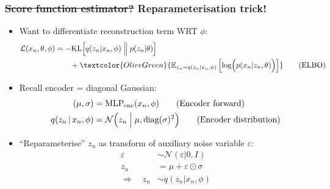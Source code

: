 \documentclass[xcolor=table,dvipsnames]{beamer}
\begin{document}
\begin{frame}[t]
    \frametitle{\sout{Score function estimator?} Reparameterisation trick!}
    \begin{itemize}
        \item Want to differentiate \textcolor{OliveGreen}{reconstruction} term WRT $\phi$:
        \begin{align*}
            \mathcal{L}(x_n, \theta, \phi) &= -\text{KL}\Bigl[q(z_n \vert x_n, \phi) \Bigm\Vert p(z_n \vert \theta)\Bigr] \\
            &\qquad + \textcolor{OliveGreen}{\mathbb{E}_{z_n\sim q(z_n \vert x_n, \phi)}\left[ \log \Bigl(p(x_n \vert z_n, \theta)\Bigr) \right]} \tag{ELBO}
        \end{align*}
        \item Recall encoder = diagonal Gaussian:
        \begin{align*}
            (\mu, \sigma) &= \text{MLP}_\text{enc}(x_n, \phi) \tag{Encoder forward} \\
            q(z_n \,\vert\, x_n, \phi) &= \mathcal{N}\Bigl( z_n \Bigm\vert \mu, \text{diag}(\sigma)^2 \Bigr) \tag{Encoder distribution}
        \end{align*}
        \item ``Reparameterise'' $z_n$ as transform of auxiliary noise variable $\varepsilon$:
        \begin{align*}
            \varepsilon &\sim \mathcal{N}(\varepsilon \vert 0, I) \tag{Auxiliary noise sample} \\
            z_n &= \mu + \varepsilon \odot \sigma \tag{Reparameterisation trick} \\
            \Rightarrow\quad z_n &\sim q(z_n \vert x_n, \phi) \tag{Desired latent sample}
        \end{align*}
    \end{itemize}
\end{frame}
\end{document}
